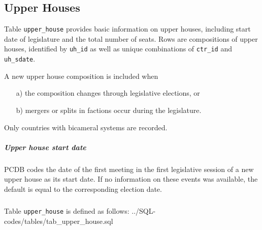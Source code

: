\subsection{Upper Houses}\label{subsec_tab_upper_house}
Table \texttt{upper\_house} provides basic information on upper houses, including start date of legislature and the total number of seats. 
Rows are compositions of upper houses, identified by \texttt{uh\_id} as well as unique combinations of \texttt{ctr\_id} and \texttt{uh\_sdate}.
 
A new upper house composition is included when
\begin{itemize}%
\item[a)]the composition changes through legislative elections, or
\item[b)]mergers or splits in factions occur during the legislature.
\end{itemize} 
Only countries with bicameral systems are recorded.

\subparagraph{Upper house start date}
PCDB codes the date of the first meeting in the first legislative session of a new upper house as its start date. 
If no information on these events was available, the default is equal to the corresponding election date. 

\subparagraph{}
Table \texttt{upper\_house} is defined as follows:
%
{../SQL-codes/tables/tab_upper_house.sql}

